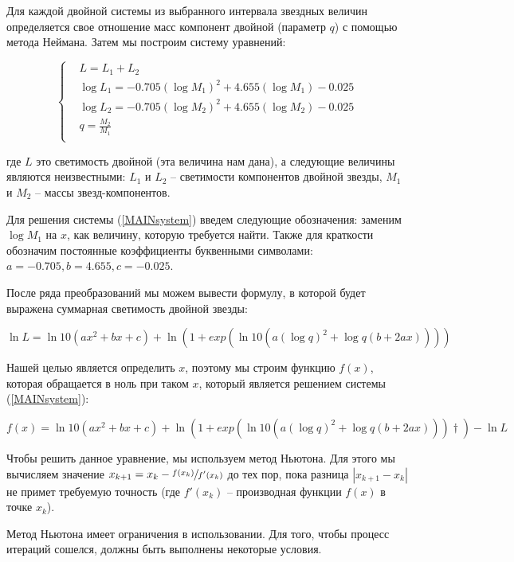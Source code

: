 \documentclass[a4paper,12pt]{article}
\begin{document}
 Для каждой двойной системы из выбранного интервала звездных величин определяется свое отношение масс компонент двойной (параметр $q$) с помощью метода Неймана. Затем мы построим систему уравнений:
 
\begin{equation}
	\left\{
		\begin{aligned}
			&L=L_1+L_2\\
			&\log{L_1}= -0.705(\log{M_1})^2  + 4.655(\log {M_1}) - 0.025\\
			&\log{L_2}= -0.705(\log{M_2})^2  + 4.655(\log {M_2}) - 0.025\\
			&q=\frac{M_2}{M_1}\\
		\end{aligned}
	\right.\label{MAINsystem}
\end{equation}

где $L$ это светимость двойной (эта величина нам дана), а следующие величины являются неизвестными:
$L_1$ и $L_2 $ -- светимости компонентов двойной звезды,
$M_1$ и $M_2$ -- массы звезд-компонентов.

Для решения системы (\ref{MAINsystem}) введем следующие обозначения: заменим $\log{M_1}$ на $x$, как величину, которую требуется найти. Также для краткости обозначим постоянные коэффициенты буквенными символами: $a=-0.705 ,b=4.655, c=- 0.025$.

После ряда преобразований мы можем вывести формулу, в которой будет выражена суммарная светимость двойной звезды:

\begin{equation}
\ln{L} = \ln{10} (ax^2+bx+c)+\ln{(1 + exp(\ln{10}(a(\log {q})^2+\log {q}(b+2ax))))}
\end{equation}

Нашей целью является определить $x$, поэтому мы строим функцию $f(x)$, которая обращается в ноль при таком $x$, который является решением системы (\ref{MAINsystem}):

\begin{equation}
f(x)=\ln{10} (ax^2+bx+c)+\ln{(1 + exp(\ln{10}(a(\log {q})^2+\log {q}(b+2ax)))†)} - \ln{L}
\end{equation}

Чтобы решить данное уравнение, мы используем метод Ньютона. 
Для этого мы вычисляем значение $x_{k+1}=x_k - \sfrac{f(x_k)}{f'(x_k)}$ 
до тех пор, пока разница $|x_{k+1} - x_k|$ не примет требуемую точность (где $f'(x_k)$ -- производная функции $f(x)$ в точке $x_k$). 

Метод Ньютона имеет ограничения в использовании. Для того, чтобы процесс итераций сошелся, должны быть выполнены некоторые условия.
\end{document}

